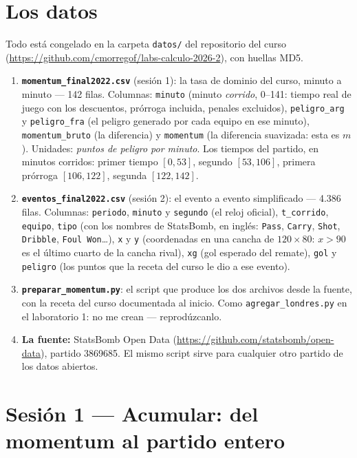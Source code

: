 \documentclass[12pt,letterpaper]{article}
\begin{document}
\section{Los datos}
Todo está congelado en la carpeta \texttt{datos/} del repositorio del curso (\url{https://github.com/cmorregof/labs-calculo-2026-2}), con huellas MD5.
\begin{enumerate}[label=\arabic*., itemsep=0.15em]
    \item \textbf{\texttt{momentum\_final2022.csv}} (sesión 1): la tasa de dominio del curso, minuto a minuto --- 142 filas. Columnas: \texttt{minuto} (minuto \emph{corrido}, 0--141: tiempo real de juego con los descuentos, prórroga incluida, penales excluidos), \texttt{peligro\_arg} y \texttt{peligro\_fra} (el peligro generado por cada equipo en ese minuto), \texttt{momentum\_bruto} (la diferencia) y \texttt{momentum} (la diferencia suavizada: esta es $m$). Unidades: \emph{puntos de peligro por minuto}. Los tiempos del partido, en minutos corridos: primer tiempo $[0,53]$, segundo $[53,106]$, primera prórroga $[106,122]$, segunda $[122,142]$.
    \item \textbf{\texttt{eventos\_final2022.csv}} (sesión 2): el evento a evento simplificado --- 4.386 filas. Columnas: \texttt{periodo}, \texttt{minuto} y \texttt{segundo} (el reloj oficial), \texttt{t\_corrido}, \texttt{equipo}, \texttt{tipo} (con los nombres de StatsBomb, en inglés: \texttt{Pass}, \texttt{Carry}, \texttt{Shot}, \texttt{Dribble}, \texttt{Foul Won}\ldots), \texttt{x} y \texttt{y} (coordenadas en una cancha de $120\times 80$: $x>90$ es el último cuarto de la cancha rival), \texttt{xg} (gol esperado del remate), \texttt{gol} y \texttt{peligro} (los puntos que la receta del curso le dio a ese evento).
    \item \textbf{\texttt{preparar\_momentum.py}}: el script que produce los dos archivos desde la fuente, con la receta del curso documentada al inicio. Como \texttt{agregar\_londres.py} en el laboratorio 1: no me crean --- reprodúzcanlo.
    \item \textbf{La fuente:} StatsBomb Open Data (\url{https://github.com/statsbomb/open-data}), partido 3869685. El mismo script sirve para cualquier otro partido de los datos abiertos.
\end{enumerate}

\section{Sesión 1 --- Acumular: del momentum al partido entero}
\end{document}
